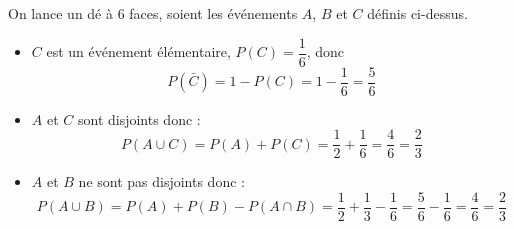 \documentclass[12pt,a4paper]{article}
\begin{document}
\begin{myex}
	On lance un dé à 6 faces, soient les événements $A$, $B$ et $C$ définis ci-dessus.
	\begin{itemize}
		\item $C$ est un événement élémentaire, $P(C)=\dfrac{1}{6}$, donc
		\begin{equation*}
			P(\bar{C})= 1- P(C) = 1 - \dfrac{1}{6} = \dfrac{5}{6}
		\end{equation*}
	
		\item $A$ et $C$ sont disjoints donc :
			\begin{equation*}
				P(A \cup C) = P(A) + P(C) = \dfrac{1}{2} + \dfrac{1}{6} = \dfrac{4}{6} = \dfrac{2}{3}
			\end{equation*}
		
		\item $A$ et $B$ ne sont pas disjoints donc :
		\begin{equation*}
			P(A \cup B) = P(A) + P(B) - P(A \cap B) = \dfrac{1}{2} + \dfrac{1}{3} - \dfrac{1}{6} = \dfrac{5}{6}  - \dfrac{1}{6} = \dfrac{4}{6} = \dfrac{2}{3}
		\end{equation*}
	\end{itemize}
\end{myex}
\end{document}

